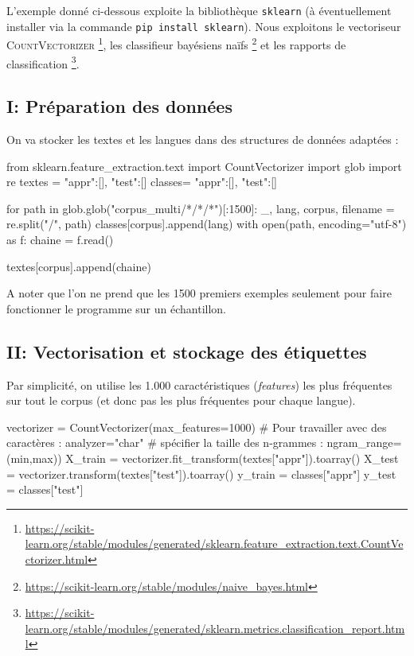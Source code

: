  L'exemple donné ci-dessous exploite la bibliothèque \texttt{sklearn} (à éventuellement installer via la commande \texttt{pip install sklearn}). Nous exploitons le vectoriseur \textsc{CountVectorizer}
 \footnote{\url{https://scikit-learn.org/stable/modules/generated/sklearn.feature_extraction.text.CountVectorizer.html}}, les classifieur bayésiens naïfs 
 \footnote{\url{https://scikit-learn.org/stable/modules/naive_bayes.html}}
 et les rapports de classification
 \footnote{\url{https://scikit-learn.org/stable/modules/generated/sklearn.metrics.classification_report.html}}.

\subsection*{I: Préparation des données}

On va stocker les textes et les langues dans des structures de données adaptées :

\begin{python}
from sklearn.feature_extraction.text import CountVectorizer
import glob
import re
textes = {"appr":[], "test":[]}
classes= {"appr":[], "test":[]}

for path in glob.glob("corpus_multi/*/*/*")[:1500]:
  _, lang, corpus, filename = re.split("/", path)
  classes[corpus].append(lang)
  with open(path, encoding="utf-8") as f:
    chaine = f.read()

  textes[corpus].append(chaine)
\end{python}

A noter que l'on ne prend que les 1500 premiers exemples seulement pour faire fonctionner le programme sur un échantillon.

\subsection*{II: Vectorisation et stockage des étiquettes}
 
 Par simplicité, on utilise les 1.000 caractéristiques (\textit{features}) les plus fréquentes sur tout le corpus (et donc pas les plus fréquentes pour chaque langue).

\begin{python}
vectorizer = CountVectorizer(max_features=1000)
# Pour travailler avec des caractères : analyzer="char"
# spécifier la taille des n-grammes : ngram_range=(min,max))
X_train = vectorizer.fit_transform(textes["appr"]).toarray()
X_test  = vectorizer.transform(textes["test"]).toarray()
y_train = classes["appr"]
y_test  = classes["test"]
\end{python}

